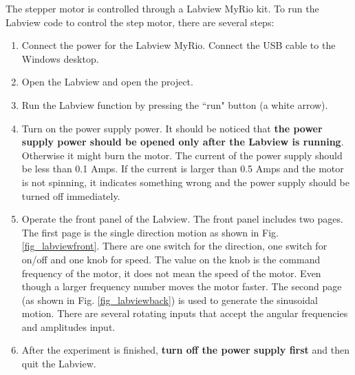 \documentclass[idxtotoc,hyperref,openany]{labbook} %
\begin{document}
The stepper motor is controlled through a Labview MyRio kit. To run the Labview code to control the step motor, there are several steps:

\begin{enumerate}
\item Connect the power for the Labview MyRio. Connect the USB cable to the Windows desktop. 
\item Open the Labview and open the project. 
\item Run the Labview function by pressing the ``run" button (a white arrow).  
\item Turn on the power supply power. It should be noticed that \textbf{the power supply power should be opened only after the Labview is running}. Otherwise it might burn the motor. The current of the power supply should be less than 0.1 Amps. If the current is larger than 0.5 Amps and the motor is not spinning, it indicates something wrong and the power supply should be turned off immediately. 
\item Operate the front panel of the Labview. The front panel includes two pages. The first page is the single direction motion as shown in Fig. \ref{fig_labviewfront}. There are one switch for the direction, one switch for on/off and one knob for speed. The value on the knob is the command frequency of the motor, it does not mean the speed of the motor. Even though a larger frequency number moves the motor faster.  The second page (as shown in Fig. \ref{fig_labviewback}) is used to generate the sinusoidal motion. There are several rotating inputs that accept the angular frequencies and amplitudes input.
\item After the experiment is finished, \textbf{turn off the power supply first} and then quit the Labview.  
\end{enumerate}
\end{document}

